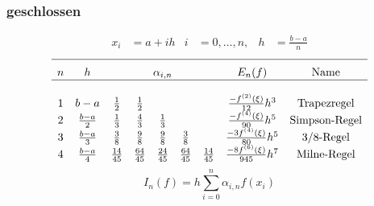 \documentclass[
ngerman,
accentcolor=9c,%
type=intern,
marginpar=false
]{tudapub}
\begin{document}
            \subsubsection{geschlossen}
                \begin{align*}
                    x_i &= a+ih &  i&=0,\dots,n, &  h&=\frac{b-a}{n}
                \end{align*}
                \begin{equation*}
                    \begin{array}{c c c c c c c c c}
                        \hline\\[-.5\normalbaselineskip]
                        n & h & \multicolumn{5}{c}{\alpha_{i,n}} & E_n(f) & \text{Name}\\
                        \hline\\
                        1 & b-a & \frac{1}{2} & \frac{1}{2} & & & & \frac{-f^{(2)}(\xi)}{12}h^3 & \text{Trapezregel}\\
                        2 & \frac{b-a}{2} & \frac{1}{3} & \frac{4}{3} & \frac{1}{3} & & & \frac{-f^{(4)}(\xi)}{90}h^5 & \text{Simpson-Regel}\\
                        3 & \frac{b-a}{3} & \frac{3}{8} & \frac{9}{8} & \frac{9}{8} & \frac{3}{8} & & \frac{-3f^{(4)}(\xi)}{80}h^5 & \text{3/8-Regel}\\
                        4 & \frac{b-a}{4} & \frac{14}{45} & \frac{64}{45} & \frac{24}{45} & \frac{64}{45} & \frac{14}{45} & \frac{-8f^{(6)}(\xi)}{945}h^7 & \text{Milne-Regel}\\
                    \end{array}
                \end{equation*}
                \begin{equation*}
                    I_n(f) = h \sum^n_{i=0} \alpha_{i,n} f(x_i)
                \end{equation*}
\end{document}
